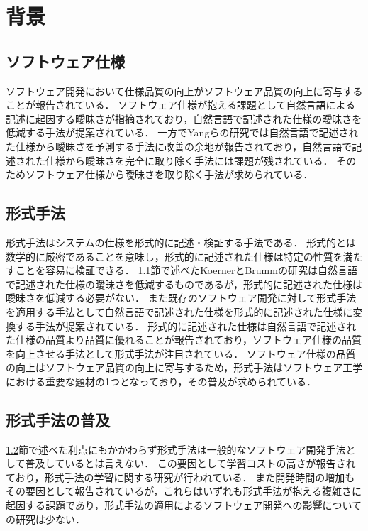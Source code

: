 \documentclass[main]{subfiles}
\begin{document}
\chapter{背景}

\section{ソフトウェア仕様}
\label{sec:specification}

ソフトウェア開発において仕様品質の向上がソフトウェア品質の向上に寄与することが報告されている\cite{knauss:2009}．
ソフトウェア仕様が抱える課題として自然言語による記述に起因する曖昧さが指摘されており\cite{kamsties:2005}，自然言語で記述された仕様の曖昧さを低減する手法が提案されている\cite{korner:2009,yang:2011}．
一方でYangらの研究では自然言語で記述された仕様から曖昧さを予測する手法に改善の余地が報告されており，自然言語で記述された仕様から曖昧さを完全に取り除く手法には課題が残されている．
そのためソフトウェア仕様から曖昧さを取り除く手法が求められている．

\section{形式手法}
\label{sec:formal-method}

形式手法はシステムの仕様を形式的に記述・検証する手法である．
形式的とは数学的に厳密であることを意味し，形式的に記述された仕様は特定の性質を満たすことを容易に検証できる．
\ref{sec:specification}節で述べたKoernerとBrummの研究\cite{korner:2009}は自然言語で記述された仕様の曖昧さを低減するものであるが，形式的に記述された仕様は曖昧さを低減する必要がない．
また既存のソフトウェア開発に対して形式手法を適用する手法として自然言語で記述された仕様を形式的に記述された仕様に変換する手法が提案されている\cite{ilieva:2005}．
形式的に記述された仕様は自然言語で記述された仕様の品質より品質に優れることが報告されており\cite{fabbrini:2001}，ソフトウェア仕様の品質を向上させる手法として形式手法が注目されている．%
ソフトウェア仕様の品質の向上はソフトウェア品質の向上に寄与するため，形式手法はソフトウェア工学における重要な題材の1つとなっており，その普及が求められている．

\section{形式手法の普及}

\ref{sec:formal-method}節で述べた利点にもかかわらず形式手法は一般的なソフトウェア開発手法として普及しているとは言えない．
この要因として学習コストの高さが報告されており\cite{kurita:2011}，形式手法の学習に関する研究が行われている\cite{ohnishi:2020,araki:2010,araki:2011}．
また開発時間の増加もその要因として報告されている\cite{kitamura:2021}が，これらはいずれも形式手法が抱える複雑さに起因する課題であり，形式手法の適用によるソフトウェア開発への影響についての研究は少ない．
\end{document}
